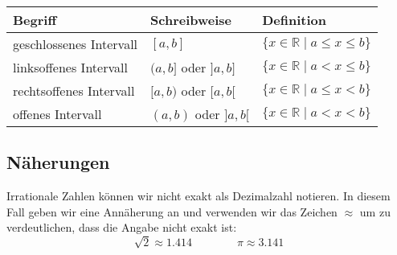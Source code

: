 \begin{center}
  \renewcommand{\arraystretch}{1.1}
  \begin{tabularx}{0.9\textwidth}{XXX}
    \textbf{Begriff} & \textbf{Schreibweise} & \textbf{Definition} \\
  \toprule
    geschlossenes Intervall & $[a, b]$ & $\{ x\in\mathbb{R} \;|\; a \leq x \leq b\}$ \\
  \midrule
    linksoffenes Intervall & $(a, b]$ oder $]a, b]$ & $\{ x\in\mathbb{R} \;|\; a< x \leq b\}$ \\
  \midrule
    rechtsoffenes Intervall & $[a, b)$ oder $[a, b[$ & $\{ x\in\mathbb{R} \;|\; a \leq x < b\}$ \\
  \midrule
    offenes Intervall & $(a, b)$ oder $]a, b[$ & $\{ x\in\mathbb{R} \;|\; a< x < b\}$ \\
  \bottomrule
  \end{tabularx}
\end{center}

\subsection{Näherungen}

Irrationale Zahlen können wir nicht exakt als Dezimalzahl notieren. In diesem Fall geben wir eine Annäherung an und verwenden wir das Zeichen $\approx$ um zu verdeutlichen, dass die Angabe nicht exakt ist:
\[
  \sqrt{2} \approx 1.414 \qquad\qquad \pi \approx 3.141
\]

